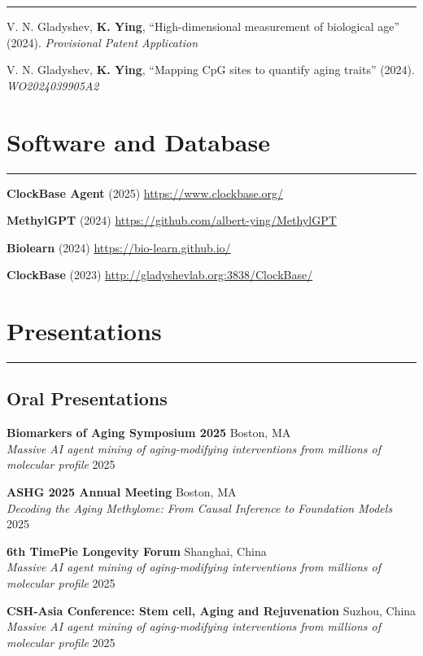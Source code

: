 \documentclass[
  11pt,
]
{article}
\begin{document}
\hrule

V. N. Gladyshev, \textbf{K. Ying}, ``High-dimensional measurement of
biological age'' (2024). \emph{Provisional Patent Application}

V. N. Gladyshev, \textbf{K. Ying}, ``Mapping CpG sites to quantify aging
traits'' (2024). \emph{WO2024039905A2}

\section{Software and Database}\label{software-and-database}

\hrule

\textbf{ClockBase Agent} (2025) \hfill \url{https://www.clockbase.org/}

\textbf{MethylGPT} (2024)
\hfill \url{https://github.com/albert-ying/MethylGPT}

\textbf{Biolearn} (2024) \hfill \url{https://bio-learn.github.io/}

\textbf{ClockBase} (2023)
\hfill \url{http://gladyshevlab.org:3838/ClockBase/}

\section{Presentations}\label{presentations}

\hrule

\subsection{Oral Presentations}\label{oral-presentations}

\textbf{Biomarkers of Aging Symposium 2025} \hfill Boston, MA\\
\emph{Massive AI agent mining of aging-modifying interventions from
millions of molecular profile} \hfill 2025

\textbf{ASHG 2025 Annual Meeting} \hfill Boston, MA\\
\emph{Decoding the Aging Methylome: From Causal Inference to Foundation
Models} \hfill 2025

\textbf{6th TimePie Longevity Forum} \hfill Shanghai, China\\
\emph{Massive AI agent mining of aging-modifying interventions from
millions of molecular profile} \hfill 2025

\textbf{CSH-Asia Conference: Stem cell, Aging and Rejuvenation}
\hfill Suzhou, China\\
\emph{Massive AI agent mining of aging-modifying interventions from
millions of molecular profile} \hfill 2025
\end{document}
